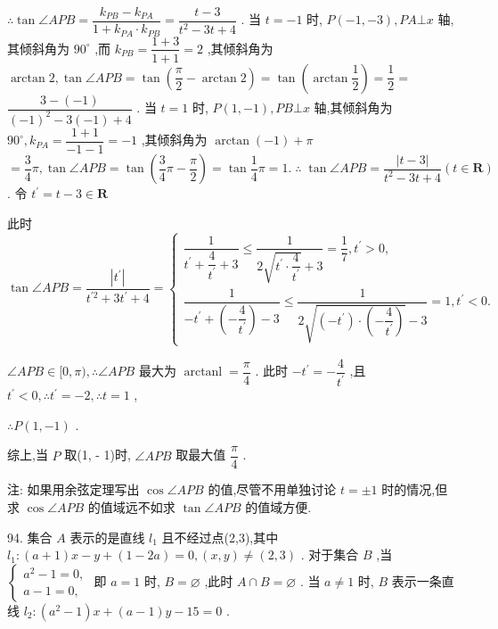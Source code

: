 $\therefore \tan \angle {APB} = \dfrac{{k}_{PB} - {k}_{PA}}{1 + {k}_{PA} \cdot  {k}_{PB}} = \dfrac{t - 3}{{t}^{2} - {3t} + 4}$ . 当 $t =  - 1$ 时, $P\left( {-1, - 3}\right) ,{PA} \bot  x$ 轴,其倾斜角为 ${90}^{ \circ  }$ ,而 ${k}_{PB} = \dfrac{1 + 3}{1 + 1} = 2$ ,其倾斜角为 $\arctan 2,\tan \angle {APB} = \tan \left( {\dfrac{\pi }{2} - \arctan 2}\right)  = \tan \left( {\arctan \dfrac{1}{2}}\right)  = \dfrac{1}{2} =$  $\dfrac{3 - \left( {-1}\right) }{{\left( -1\right) }^{2} - 3\left( {-1}\right)  + 4}$ . 当 $t = 1$ 时, $P\left( {1, - 1}\right) ,{PB} \bot  x$ 轴,其倾斜角为 ${90}^{ \circ  },{k}_{PA} = \dfrac{1 + 1}{-1 - 1} =  - 1$ ,其倾斜角为 $\arctan \left( {-1}\right)  + \pi$  $= \dfrac{3}{4}\pi ,\tan \angle {APB} = \tan \left( {\dfrac{3}{4}\pi  - \dfrac{\pi }{2}}\right)  = \tan \dfrac{1}{4}\pi  = 1.\;\therefore \;\tan \angle {APB} = \dfrac{\left| t - 3\right| }{{t}^{2} - {3t} + 4}\left( {t \in  \mathbf{R}}\right)$ . 令 ${t}^{\prime } = t - 3 \in  \mathbf{R}$

此时 $\tan \angle {APB} = \dfrac{\left| {t}^{\prime }\right| }{{t}^{\prime 2} + 3{t}^{\prime } + 4} = \left\{  \begin{array}{l} \dfrac{1}{{t}^{\prime } + \dfrac{4}{{t}^{\prime }} + 3} \leq  \dfrac{1}{2\sqrt{{t}^{\prime } \cdot  \dfrac{4}{{t}^{\prime }}} + 3} = \dfrac{1}{7},{t}^{\prime } > 0, \\  \dfrac{1}{-{t}^{\prime } + \left( {-\dfrac{4}{{t}^{\prime }}}\right)  - 3} \leq  \dfrac{1}{2\sqrt{\left( {-{t}^{\prime }}\right)  \cdot  \left( {-\dfrac{4}{{t}^{\prime }}}\right) } - 3} = 1,{t}^{\prime } < 0. \end{array}\right.$

$\angle {APB} \in  \lbrack 0,\pi ),\therefore \angle {APB}$ 最大为 $\operatorname{arctanl} = \dfrac{\pi }{4}$ . 此时 $- {t}^{\prime } =  - \dfrac{4}{{t}^{\prime }}$ ,且 ${t}^{\prime } < 0,\therefore {t}^{\prime } =  - 2,\therefore t = 1$ ,

$\therefore P\left( {1, - 1}\right)$ .

综上,当 $P$ 取(1, - 1)时, $\angle {APB}$ 取最大值 $\dfrac{\pi }{4}$ .

注: 如果用余弦定理写出 $\cos \angle {APB}$ 的值,尽管不用单独讨论 $t =  \pm  1$ 时的情况,但求 $\cos \angle {APB}$ 的值域远不如求 $\tan \angle {APB}$ 的值域方便.

94. 集合 $A$ 表示的是直线 ${l}_{1}$ 且不经过点(2,3),其中 ${l}_{1} : \left( {a + 1}\right) x - y + \left( {1 - {2a}}\right)  = 0,\left( {x,y}\right)  \neq  \left( {2,3}\right)$ . 对于集合 $B$ ,当 $\left\{  \begin{array}{l} {a}^{2} - 1 = 0, \\  a - 1 = 0, \end{array}\right.$ 即 $a = 1$ 时, $B = \varnothing$ ,此时 $A \cap  B = \varnothing$ . 当 $a \neq  1$ 时, $B$ 表示一条直线 ${l}_{2} : \left( {{a}^{2} - 1}\right) x + \left( {a - 1}\right) y - {15} = 0$ .

